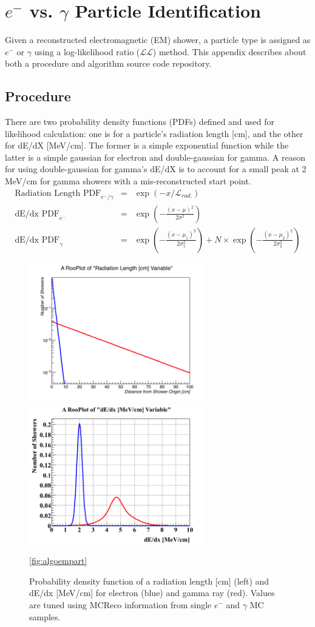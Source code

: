 \section{$e^{-}$ vs. $\gamma$ Particle Identification}
Given a reconstructed electromagnetic (EM) shower, a particle type is assigned as $e^{-}$ or $\gamma$ using
a log-likelihood ratio ($\mathcal{LL}$) method. This appendix describes about both a procedure and algorithm source code repository.

\subsection{Procedure}
There are two probability density functions (PDFs) defined and used for likelihood calculation: one
is for a particle's radiation length [cm], and the other for dE/dX [MeV/cm]. The former is a simple
exponential function while the latter is a simple gaussian for electron and double-gaussian for gamma.
A reason for using double-gaussian for gamma's dE/dX is to account for a small peak at 2 MeV/cm for gamma
showers with a mis-reconstructed start point.
\begin{eqnarray}
  \text{Radiation Length PDF}_{e^{-}/\gamma} &=& \exp\left(-x/\mathcal{L}_{rad.}\right)\\
  \text{dE/dx PDF}_{e^{-}} &=& \exp\left(-\frac{(x-\mu)^2}{2\sigma^2}\right)\\
  \text{dE/dx PDF}_{\gamma} &=& \exp\left(-\frac{(x-\mu_1)^2}{2\sigma_1^2}\right) + N\times\exp\left(-\frac{(x-\mu_2)^2}{2\sigma_2^2}\right)
\end{eqnarray}
\begin{figure}[htb]
\begin{center}
  \includegraphics[width=3in]{RadLength.png}
  \includegraphics[width=3in]{dEdx.png}
  \caption{Probability density function of a radiation length [cm] (left) and dE/dx [MeV/cm]
    for electron (blue) and gamma ray (red). Values are tuned using MCReco information from single
    $e^{-}$ and $\gamma$ MC samples.}
  \ref{fig:algoempart}
\end{center}
\end{figure}
